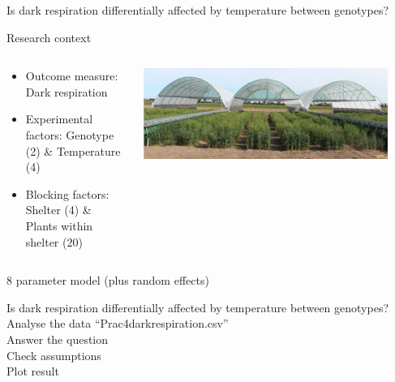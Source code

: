 \documentclass{beamer}
\begin{document}
\begin{frame}{Is dark respiration differentially affected by temperature between genotypes?}
  \begin{block}{Research context}
 \begin{columns}
  \begin{column}{0.8\textwidth}
   \begin{itemize}
      \item Outcome measure: Dark respiration
      \item Experimental factors:  Genotype (2) \& Temperature (4)
      \item Blocking factors:  Shelter (4) \&  Plants within shelter (20)

   \end{itemize}
  \end{column}
  \begin{column}{0.2\textwidth}
    \includegraphics[width=0.9\textwidth]{Figures/darkresp}
  \end{column}

 \end{columns}
 \end{block}

8 parameter model (plus random effects)
 
 \end{frame}

\begin{frame}{Is dark respiration differentially affected by temperature between genotypes?}
 Analyse the data ``Prac4darkrespiration.csv''\\
 Answer the question\\
 Check assumptions\\
 Plot result
\end{frame}
\end{document}
